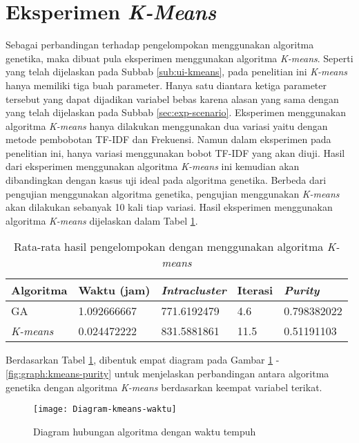 \section{Eksperimen \textit{K-Means}}
Sebagai perbandingan terhadap pengelompokan menggunakan algoritma genetika, maka dibuat pula eksperimen menggunakan algoritma \textit{K-means}. Seperti yang telah dijelaskan pada Subbab \ref{sub:ui-kmeans}, pada penelitian ini \textit{K-means} hanya memiliki tiga buah parameter. Hanya satu diantara ketiga parameter tersebut yang dapat dijadikan variabel bebas karena alasan yang sama dengan yang telah dijelaskan pada Subbab \ref{sec:exp-scenario}. Eksperimen menggunakan algoritma \textit{K-means} hanya dilakukan menggunakan dua variasi yaitu dengan metode pembobotan TF-IDF dan Frekuensi. Namun dalam eksperimen pada penelitian ini, hanya variasi menggunakan bobot TF-IDF yang akan diuji. Hasil dari eksperimen menggunakan algoritma \textit{K-means} ini kemudian akan dibandingkan dengan kasus uji ideal pada algoritma genetika. Berbeda dari pengujian menggunakan algoritma genetika, pengujian menggunakan \textit{K-means} akan dilakukan sebanyak 10 kali tiap variasi. Hasil eksperimen menggunakan algoritma \textit{K-means} dijelaskan dalam Tabel \ref{tbl:exp-kmeans}.

\begin{table}[H]
	\centering
	\caption{Rata-rata hasil pengelompokan dengan menggunakan algoritma \textit{K-means}}
	\begin{tabular}{|l|l|l|l|l|} \hline
		Algoritma & Waktu (jam) & \textit{Intracluster} & Iterasi& \textit{Purity} \\ \hline
		GA      & 1.092666667 & 771.6192479 & 4.6  & 0.798382022 \\ \hline
		\textit{K-means} & 0.024472222 & 831.5881861 & 11.5 & 0.51191103 \\ \hline
	\end{tabular}
	\label{tbl:exp-kmeans}
\end{table}

Berdasarkan Tabel \ref{tbl:exp-kmeans}, dibentuk empat diagram pada Gambar \ref{fig:graph:kmeans-time} - \ref{fig:graph:kmeans-purity} untuk menjelaskan perbandingan antara algoritma genetika dengan algoritma \textit{K-means} berdasarkan keempat variabel terikat.

\begin{figure}[H]
	\centering
	\texttt{[image: Diagram-kmeans-waktu]}
	\caption{Diagram hubungan algoritma dengan waktu tempuh}
	\label{fig:graph:kmeans-time}
\end{figure}

